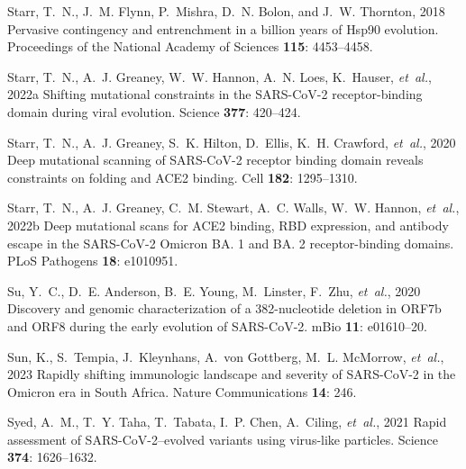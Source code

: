 \documentclass[9pt,twocolumn,twoside]{gsajnl_modified}
\begin{document}
{\begin{thebibliography}{76}
{Starr, T.~N., J.~M. Flynn, P.~Mishra, D.~N. Bolon, {\rm and} J.~W. Thornton},
  2018 Pervasive contingency and entrenchment in a billion years of {Hsp90}
  evolution. Proceedings of the National Academy of Sciences {\bf 115}:
  4453--4458.

{Starr, T.~N., A.~J. Greaney, W.~W. Hannon, A.~N. Loes, K.~Hauser, {\em
  et~al.\/}}, 2022{a} Shifting mutational constraints in the {SARS-CoV-2}
  receptor-binding domain during viral evolution. Science {\bf 377}: 420--424.

{Starr, T.~N., A.~J. Greaney, S.~K. Hilton, D.~Ellis, K.~H. Crawford, {\em
  et~al.\/}}, 2020 {Deep mutational scanning of SARS-CoV-2 receptor binding
  domain reveals constraints on folding and ACE2 binding}. Cell {\bf 182}:
  1295--1310.

{Starr, T.~N., A.~J. Greaney, C.~M. Stewart, A.~C. Walls, W.~W. Hannon, {\em
  et~al.\/}}, 2022{b} {Deep mutational scans for ACE2 binding, RBD expression,
  and antibody escape in the SARS-CoV-2 Omicron BA. 1 and BA. 2
  receptor-binding domains}. PLoS Pathogens {\bf 18}: e1010951.

{Su, Y.~C., D.~E. Anderson, B.~E. Young, M.~Linster, F.~Zhu, {\em et~al.\/}},
  2020 {Discovery and genomic characterization of a 382-nucleotide deletion in
  ORF7b and ORF8 during the early evolution of SARS-CoV-2}. mBio {\bf 11}:
  e01610--20.

{Sun, K., S.~Tempia, J.~Kleynhans, A.~von Gottberg, M.~L. McMorrow, {\em
  et~al.\/}}, 2023 {Rapidly shifting immunologic landscape and severity of
  SARS-CoV-2 in the Omicron era in South Africa}. Nature Communications {\bf
  14}: 246.

{Syed, A.~M., T.~Y. Taha, T.~Tabata, I.~P. Chen, A.~Ciling, {\em et~al.\/}},
  2021 Rapid assessment of {SARS-CoV-2}--evolved variants using virus-like
  particles. Science {\bf 374}: 1626--1632.


\end{thebibliography}}
\end{document}
